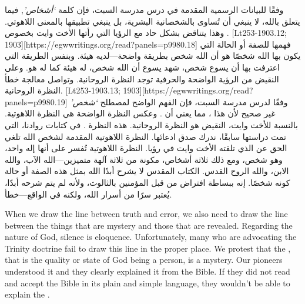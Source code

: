 وفقًا للبيانات الرسمية المقدمة في درس مدرسة السبت، فإن كلمة \textit{‘أشخاص’},\textit{ }فيما يتعلق بالله، لا ينبغي أن تُساوى بالشخصانية البشرية، بل ينبغي تطبيقها بالمعنى اللاهوتي. وهذا يتناقض بشكل حاد مع الرؤيا التي رأتها الأخت وايت بخصوص . [Lt253-1903.12; 1903][https://egwwritings.org/read?panels=p9980.18] فهمها للصفة أو الحالة التي يكون بها الله شخصًا هو أن الله شخص بطريقة واضحة—لديه هيئة. وبنفس الطريقة التي اعترفت بها أن يسوع شخص، شهد يسوع أن الله شخص، له هيئة كما له هو. وعلى النقيض من الرؤية الواضحة والحرفية توجد النظرة الروحانية. وتواصل معالجة خطأ النظرة الروحانية. [Lt253-1903.13; 1903][https://egwwritings.org/read?panels=p9980.19] وفقًا لدرس مدرسة السبت، فإن الفهم الواضح لمصطلح \textit{‘شخص’ }غير صحيح لأن هذا ، مما يعني أن . وعكس النظرة الواضحة هي النظرة اللاهوتية. بالنسبة للأخت وايت، النقيض هو النظرة الروحانية. هذه النظرة . في كتابات روادنا، التي تمت دراستها سابقًا، ندرك صدق ادعائها. النظرة اللاهوتية المقدمة لشخص الله تلغي الحق عن  الذي تلقته الأخت وايت في رؤيا. النظرة اللاهوتية تُفسر على أنها إله واحد، وهو شخص، ومع ذلك ثلاثة أشخاص، مكونة من ثلاثة آلهة متميزين—الله الآب، والله الابن، والله الروح القدس. الكتاب المقدس لا يشرح أبدًا الله بمثل هذه الصفة أو حالة كونه شخصًا. إنه ببساطة افتراض من قبل المؤمنين بالثالوث، ولأنه لم يتم شرحه أبدًا، يُعتبر سرًا من أسرار الله، ولكنه في الواقع—خطأ.


When we draw the line between truth and error, we also need to draw the line between the things that are mystery and those that are revealed. Regarding the nature of God, silence is eloquence. Unfortunately, many who are advocating the Trinity doctrine fail to draw this line in the proper place. We protest that the , that is the quality or state of God being a person, is a mystery. Our pioneers understood it and they clearly explained it from the Bible. If they did not read and accept the Bible in its plain and simple language, they wouldn’t be able to explain the .


